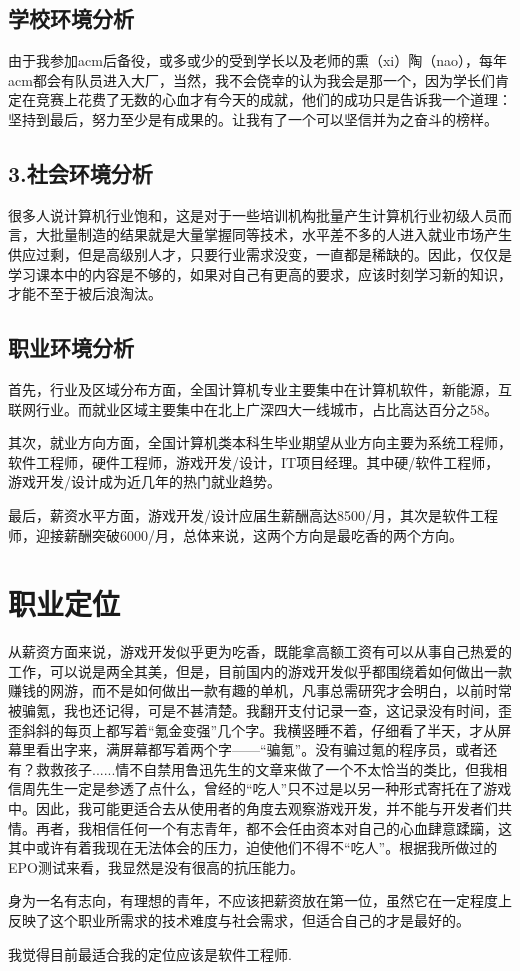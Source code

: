 \documentclass{article}
\begin{document}
	\subsection{学校环境分析}
	由于我参加acm后备役，或多或少的受到学长以及老师的熏（xi）陶（nao），每年acm都会有队员进入大厂，当然，我不会侥幸的认为我会是那一个，因为学长们肯定在竞赛上花费了无数的心血才有今天的成就，他们的成功只是告诉我一个道理：坚持到最后，努力至少是有成果的。让我有了一个可以坚信并为之奋斗的榜样。\par
	\subsection{3.社会环境分析}
	很多人说计算机行业饱和，这是对于一些培训机构批量产生计算机行业初级人员而言，大批量制造的结果就是大量掌握同等技术，水平差不多的人进入就业市场产生供应过剩，但是高级别人才，只要行业需求没变，一直都是稀缺的。因此，仅仅是学习课本中的内容是不够的，如果对自己有更高的要求，应该时刻学习新的知识，才能不至于被后浪淘汰。\par
	
	
	\subsection{职业环境分析}
	首先，行业及区域分布方面，全国计算机专业主要集中在计算机软件，新能源，互联网行业。而就业区域主要集中在北上广深四大一线城市，占比高达百分之58。\par
	其次，就业方向方面，全国计算机类本科生毕业期望从业方向主要为系统工程师，软件工程师，硬件工程师，游戏开发/设计，IT项目经理。其中硬/软件工程师，游戏开发/设计成为近几年的热门就业趋势。\par
	最后，薪资水平方面，游戏开发/设计应届生薪酬高达8500/月，其次是软件工程师，迎接薪酬突破6000/月，总体来说，这两个方向是最吃香的两个方向。\par
	
	\section{职业定位}
	从薪资方面来说，游戏开发似乎更为吃香，既能拿高额工资有可以从事自己热爱的工作，可以说是两全其美，但是，目前国内的游戏开发似乎都围绕着如何做出一款赚钱的网游，而不是如何做出一款有趣的单机，凡事总需研究才会明白，以前时常被骗氪，我也还记得，可是不甚清楚。我翻开支付记录一查，这记录没有时间，歪歪斜斜的每页上都写着“氪金变强”几个字。我横竖睡不着，仔细看了半天，才从屏幕里看出字来，满屏幕都写着两个字——“骗氪”。没有骗过氪的程序员，或者还有？救救孩子......情不自禁用鲁迅先生的文章来做了一个不太恰当的类比，但我相信周先生一定是参透了点什么，曾经的“吃人”只不过是以另一种形式寄托在了游戏中。因此，我可能更适合去从使用者的角度去观察游戏开发，并不能与开发者们共情。再者，我相信任何一个有志青年，都不会任由资本对自己的心血肆意蹂躏，这其中或许有着我现在无法体会的压力，迫使他们不得不“吃人”。根据我所做过的EPO测试来看，我显然是没有很高的抗压能力。\par
	身为一名有志向，有理想的青年，不应该把薪资放在第一位，虽然它在一定程度上反映了这个职业所需求的技术难度与社会需求，但适合自己的才是最好的。\par
	我觉得目前最适合我的定位应该是软件工程师.\par
\end{document}
